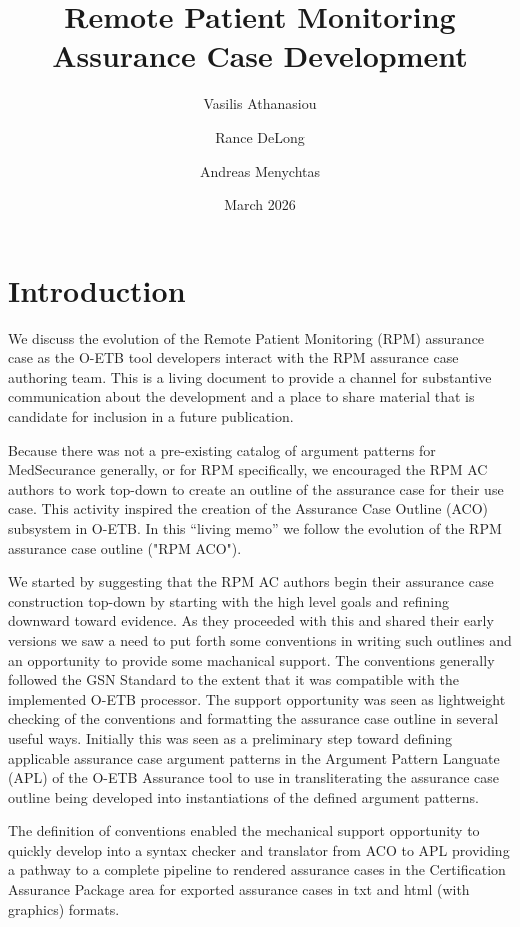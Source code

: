 \documentclass{article}
\title{Remote Patient Monitoring\\Assurance Case Development}
\author[1]{Vasilis Athanasiou}
\author[2]{Rance DeLong}
\author[1]{Andreas Menychtas}
\affil[1]{BioAssist}
\affil[2]{The Open Group}
\date{March 2026}
\begin{document}
\maketitle
\tableofcontents
\clearpage
\section{Introduction}
We discuss the evolution of the Remote Patient Monitoring (RPM) assurance case as the O-ETB tool developers interact with the RPM assurance case authoring team.
This is a living document to provide a channel for substantive communication about the development and a place to share material that is candidate for inclusion in a future publication.

Because there was not a pre-existing catalog of argument patterns for MedSecurance generally, or for RPM specifically, we encouraged the RPM AC authors to work top-down to create an outline of the assurance case for their use case.
This activity inspired the creation of the Assurance Case Outline (ACO) subsystem in O-ETB.
In this ``living memo'' we follow the evolution of the RPM assurance case outline ("RPM ACO").

We started by suggesting that the RPM AC authors begin their assurance case construction top-down by starting with the high level goals and refining downward toward evidence.
As they proceeded with this and shared their early versions we saw a need to put forth some conventions in writing such outlines and an opportunity to provide some machanical support.
The conventions generally followed the GSN Standard to the extent that it was compatible with the implemented O-ETB processor.
The support opportunity was seen as lightweight checking of the conventions and formatting the assurance case outline in several useful ways.
Initially this was seen as a preliminary step toward defining applicable assurance case argument patterns in the Argument Pattern Languate (APL) of the O-ETB Assurance tool to use in transliterating the assurance case outline being developed into instantiations of the defined argument patterns.

The definition of conventions enabled the mechanical support opportunity to quickly develop into a syntax checker and translator from ACO to APL providing a pathway to a complete pipeline to rendered assurance cases in the Certification Assurance Package area for exported assurance cases in txt and html (with graphics) formats.
\end{document}
